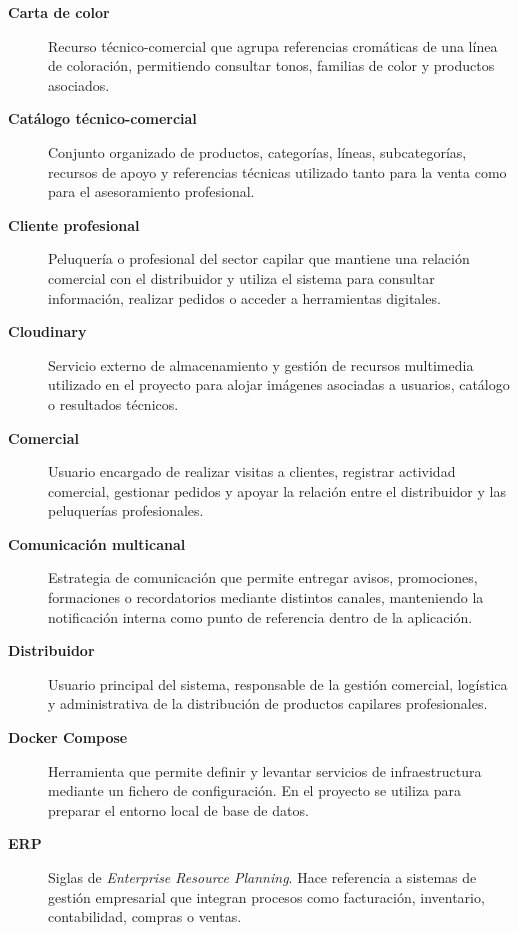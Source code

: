 \begin{description}
\item[\textbf{Carta de color}]
Recurso técnico-comercial que agrupa referencias cromáticas de una línea de coloración, permitiendo consultar tonos, familias de color y productos asociados.

\item[\textbf{Catálogo técnico-comercial}]
Conjunto organizado de productos, categorías, líneas, subcategorías, recursos de apoyo y referencias técnicas utilizado tanto para la venta como para el asesoramiento profesional.

\item[\textbf{Cliente profesional}]
Peluquería o profesional del sector capilar que mantiene una relación comercial con el distribuidor y utiliza el sistema para consultar información, realizar pedidos o acceder a herramientas digitales.

\item[\textbf{Cloudinary}]
Servicio externo de almacenamiento y gestión de recursos multimedia utilizado en el proyecto para alojar imágenes asociadas a usuarios, catálogo o resultados técnicos.

\item[\textbf{Comercial}]
Usuario encargado de realizar visitas a clientes, registrar actividad comercial, gestionar pedidos y apoyar la relación entre el distribuidor y las peluquerías profesionales.

\item[\textbf{Comunicación multicanal}]
Estrategia de comunicación que permite entregar avisos, promociones, formaciones o recordatorios mediante distintos canales, manteniendo la notificación interna como punto de referencia dentro de la aplicación.

\item[\textbf{Distribuidor}]
Usuario principal del sistema, responsable de la gestión comercial, logística y administrativa de la distribución de productos capilares profesionales.

\item[\textbf{Docker Compose}]
Herramienta que permite definir y levantar servicios de infraestructura mediante un fichero de configuración. En el proyecto se utiliza para preparar el entorno local de base de datos.

\item[\textbf{ERP}]
Siglas de \textit{Enterprise Resource Planning}. Hace referencia a sistemas de gestión empresarial que integran procesos como facturación, inventario, contabilidad, compras o ventas.


\end{description}
